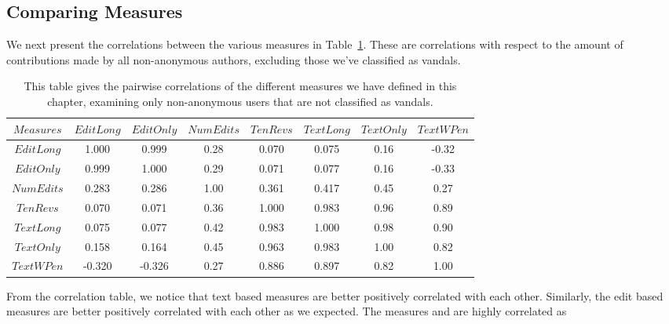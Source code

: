 \pagebreak
\subsection{Comparing Measures}

We next present the correlations between the various measures
in Table~\ref{tab:measure-correlations}.
These are correlations with respect to the amount of contributions
made by all non-anonymous authors, excluding those we've classified
as vandals.
%
\begin{table}
\begin{center}
\begin{tabular}{|c||c|c|c|c|c|c|c|}
	\hline
$Measures$ &  $EditLong$ & $EditOnly$ & $NumEdits$ & $TenRevs$ & $TextLong$ & $TextOnly$ & $TextWPen$ \\
        \hline \hline
$EditLong$         &  1.000  & 0.999  &  0.28  &         0.070  & 0.075  &  0.16  & -0.32 \\
$EditOnly$         &  0.999  & 1.000  &  0.29  &         0.071  & 0.077  &  0.16  & -0.33 \\
$NumEdits$         &  0.283  & 0.286  &  1.00  &         0.361  & 0.417  &  0.45  &  0.27 \\
$TenRevs$          &  0.070  & 0.071  &  0.36  &         1.000  & 0.983  &  0.96  &  0.89 \\
$TextLong$         &  0.075  & 0.077  &  0.42  &         0.983  & 1.000  &  0.98  &  0.90 \\
$TextOnly$         &  0.158  & 0.164  &  0.45  &         0.963  & 0.983  &  1.00  &  0.82 \\
$TextWPen$         & -0.320  &-0.326  &  0.27  &         0.886  & 0.897  &  0.82  &  1.00 \\
        \hline
\end{tabular}
\end{center}
\caption[Correlations between author contribution measures]{
This table gives the pairwise correlations of the different measures we
have defined in this chapter, examining only non-anonymous users that
are not classified as vandals.}
\label{tab:measure-correlations}
\end{table}
%
From the correlation table, we notice that text based measures are
better positively correlated with each other.
Similarly, the edit based measures are better positively correlated
with each other as we expected.
The measures \editlong and \editonly are highly correlated as
